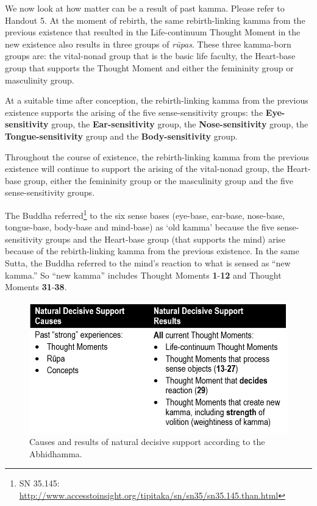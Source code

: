 We now look at how matter can be a result of past kamma. Please refer to Handout 5. At the moment of rebirth, the same rebirth-linking kamma from the previous existence that resulted in the Life-continuum Thought Moment in the new existence also results in three groups of \textit{rūpas}. These three kamma-born groups are: the vital-nonad group that is the basic life faculty, the Heart-base group that supports the Thought Moment and either the femininity group or masculinity group.

At a suitable time after conception, the rebirth-linking kamma from the previous existence supports the arising of the five sense-sensitivity groups: the \textbf{Eye-sensitivity} group, the \textbf{Ear-sensitivity} group, the \textbf{Nose-sensitivity} group, the \textbf{Tongue-sensitivity} group and the \textbf{Body-sensitivity} group.

Throughout the course of existence, the rebirth-linking kamma from the previous existence will continue to support the arising of the vital-nonad group, the Heart-base group, either the femininity group or the masculinity group and the five sense-sensitivity groups.

The Buddha referred\footnote{SN 35.145: \url{http://www.accesstoinsight.org/tipitaka/sn/sn35/sn35.145.than.html}} to the six sense bases (eye-base, ear-base, nose-base, tongue-base, body-base and mind-base) as ‘old kamma’ because the five sense-sensitivity groups and the Heart-base group (that supports the mind) arise because of the rebirth-linking kamma from the previous existence. In the same Sutta, the Buddha referred to the mind’s reaction to what is sensed as ``new kamma.'' So ``new kamma'' includes Thought Moments \textbf{1}-\textbf{12} and Thought Moments \textbf{31}-\textbf{38}.

\begin{figure}[h]
\centering
\includegraphics[width=0.7\linewidth]{./Diagrams/NDS}
\caption{Causes and results of natural decisive support according to the Abhidhamma.}
\label{fig:NDS}
\end{figure}

